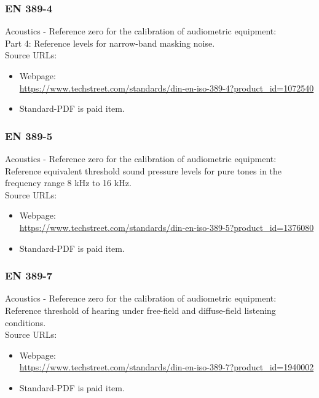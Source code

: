 \documentclass[12pt,]{article}
\begin{document}
	\subsubsection{EN 389-4}
	Acoustics - Reference zero for the calibration of audiometric equipment:\\
	Part 4: Reference levels for narrow-band masking noise.\\
	
	Source URLs:
	\begin{itemize}
		\item Webpage:\\
		\url{https://www.techstreet.com/standards/din-en-iso-389-4?product_id=1072540}
		
		\item Standard-PDF is paid item.
	\end{itemize}

	\subsubsection{EN 389-5}
	Acoustics - Reference zero for the calibration of audiometric equipment:\\
	Reference equivalent threshold sound pressure levels for pure tones in the frequency range 8 kHz to 16 kHz.\\
	
	Source URLs:
	\begin{itemize}
		\item Webpage:\\
		\url{https://www.techstreet.com/standards/din-en-iso-389-5?product_id=1376080}
		
		\item Standard-PDF is paid item.
	\end{itemize}

	\subsubsection{EN 389-7}
	Acoustics - Reference zero for the calibration of audiometric equipment:\\
	Reference threshold of hearing under free-field and diffuse-field listening conditions.\\
	
	Source URLs:
	\begin{itemize}
		\item Webpage:\\
		\url{https://www.techstreet.com/standards/din-en-iso-389-7?product_id=1940002}
		
		\item Standard-PDF is paid item.
	\end{itemize}
\end{document}
